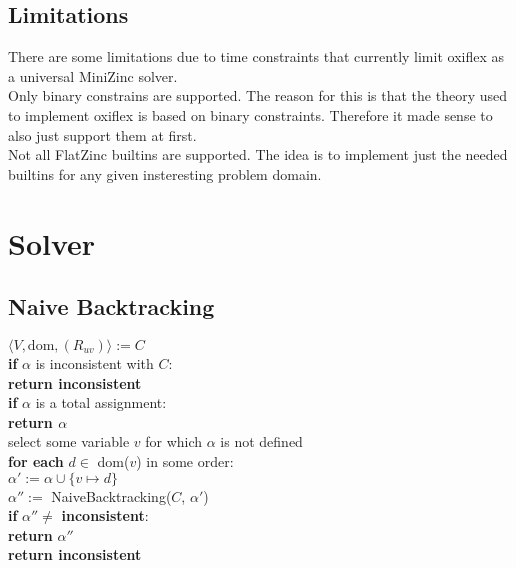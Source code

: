 \subsection{Limitations}

There are some limitations due to time constraints that currently limit oxiflex as a universal MiniZinc solver. \\

Only binary constrains are supported. The reason for this is that the theory used to implement oxiflex is based on binary constraints. Therefore it made sense to also just support them at first. \\

Not all FlatZinc builtins are supported. The idea is to implement just the needed builtins for any given insteresting problem domain.

\section{Solver}


\subsection{Naive Backtracking}

\begin{tcolorbox}[title=function NaiveBacktracking)]
	$\langle V, \text{dom}, (R_{uv})\rangle := C$ \\
	\textbf{if} $\alpha$ is inconsistent with $C$: \\
	\textbf{return inconsistent} \\
	\textbf{if} $\alpha$ is a total assignment: \\
	\textbf{return $\alpha$} \\
	select some variable $v$ for which $\alpha$ is not defined \\
	\textbf{for each} $d \in$ dom($v$) in some order: \\
	$\alpha' := \alpha \cup \{v \mapsto d\}$ \\
	$\alpha'' := $ NaiveBacktracking($C$, $\alpha'$) \\
	\textbf{if} $\alpha'' \neq$ \textbf{inconsistent}: \\
	\textbf{return} $\alpha''$ \\
	\textbf{return inconsistent}
\end{tcolorbox}

